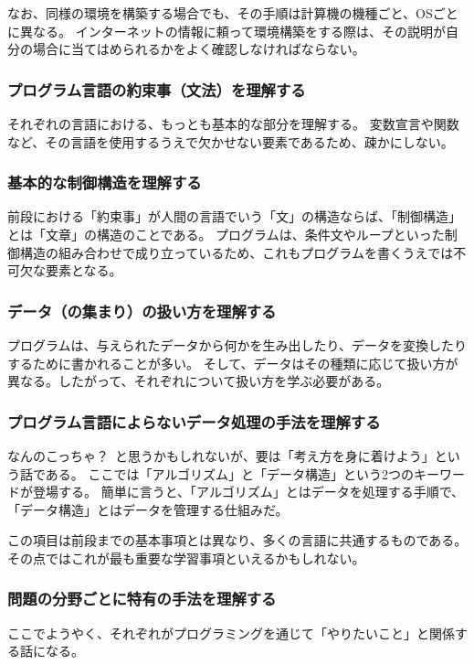 \documentclass[lualatex,ja=standard,12pt,a4j]{bxjsbook}
\begin{document}
					なお、同様の環境を構築する場合でも、その手順は計算機の機種ごと、OSごとに異なる。
	                インターネットの情報に頼って環境構築をする際は、その説明が自分の場合に当てはめられるかをよく確認しなければならない。
					
				\subsubsection{プログラム言語の約束事（文法）を理解する}
	                それぞれの言語における、もっとも基本的な部分を理解する。
                  変数宣言や関数など、その言語を使用するうえで欠かせない要素であるため、疎かにしない。
				
				\subsubsection{基本的な制御構造を理解する}
					前段における「約束事」が人間の言語でいう「文」の構造ならば、「制御構造」とは「文章」の構造のことである。
	                プログラムは、条件文やループといった制御構造の組み合わせで成り立っているため、これもプログラムを書くうえでは不可欠な要素となる。
	                
				\subsubsection{データ（の集まり）の扱い方を理解する}
					プログラムは、与えられたデータから何かを生み出したり、データを変換したりするために書かれることが多い。
	                そして、データはその種類に応じて扱い方が異なる。したがって、それぞれについて扱い方を学ぶ必要がある。
					
				\subsubsection{プログラム言語によらないデータ処理の手法を理解する}
					なんのこっちゃ？\ と思うかもしれないが、要は「考え方を身に着けよう」という話である。
	                ここでは「アルゴリズム」と「データ構造」という2つのキーワードが登場する。
	                簡単に言うと、「アルゴリズム」とはデータを処理する手順で、「データ構造」とはデータを管理する仕組みだ。
	                
	                この項目は前段までの基本事項とは異なり、多くの言語に共通するものである。
	                その点ではこれが最も重要な学習事項といえるかもしれない。
					
				\subsubsection{問題の分野ごとに特有の手法を理解する}
	                ここでようやく、それぞれがプログラミングを通じて「やりたいこと」と関係する話になる。
	                
\end{document}
